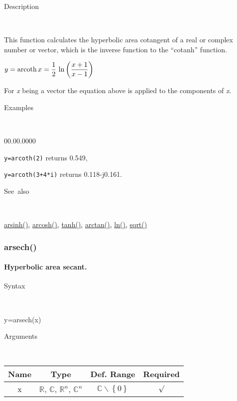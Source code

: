 \begin{description}
\item [Description]~
\end{description}
This function calculates the hyperbolic area cotangent of a real or
complex number or vector, which is the inverse function to the {}``cotanh''
function.

\medskip{}
$y=\textrm{arcoth\,}x={\displaystyle \frac{1}{2}\,\ln\left(\frac{x+1}{x-1}\right)}$ 
\medskip{}

For \textit{x} being a vector the equation above is applied
to the components of \textit{x}.

\begin{description}
\item [Examples]~
\end{description}
\begin{lyxlist}{00.00.0000}
\item [\texttt{y=arcoth(2)}]returns 0.549,
\item [\texttt{y=arcoth(3+4{*}i)}]returns 0.118-j0.161.
\end{lyxlist}
\begin{description}
\item [See~also]~
\end{description}
\textcolor{blue}{\hyperlink{arsinh}{arsinh()}}\textcolor{black}{,}
\textcolor{blue}{\hyperlink{arcosh}{arcosh()}}\textcolor{black}{,}
\textcolor{blue}{\hyperlink{tanh}{tanh()}}\textcolor{black}{,} \textcolor{blue}{\hyperlink{arctan}{arctan()}}\textcolor{black}{,}
\textcolor{blue}{\hyperlink{ln}{ln()}}\textcolor{black}{,} \textcolor{blue}{\hyperlink{sqrt}{sqrt()}}


\newpage
\subsubsection*{\hypertarget{arsech}{}{\Large arsech()}}


\paragraph{\label{par:Hyperbolic-area-sec}Hyperbolic area secant.}

\begin{description}
\item [Syntax]~
\end{description}
y=arsech(x)

\begin{description}
\item [Arguments]~
\end{description}
\begin{tabular}{|c|c|c|c|}
\hline 
Name&
Type&
Def. Range&
Required\tabularnewline
\hline
\hline 
x&
$\mathbb{R}$, $\mathbb{C}$, $\mathbb{R}^{n}$, $\mathbb{C}^{n}$&
$\mathbb{C}\backslash \left\lbrace 0\right\rbrace $&
$\surd$\tabularnewline
\hline
\end{tabular}

